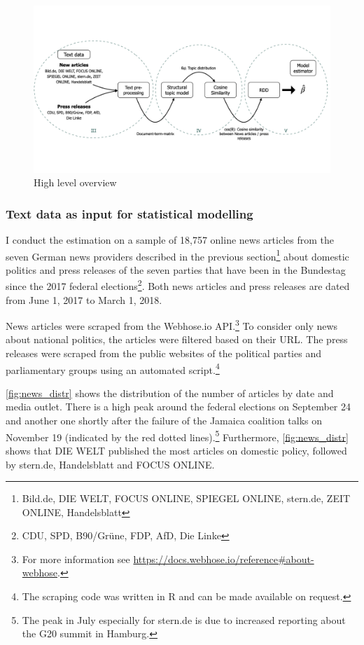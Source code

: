 \documentclass[
  12pt,
]{article}
\begin{document}
\begin{figure}
\centering
\includegraphics{../figs/high_level_overview.png}
\caption{High level overview}
\end{figure}

\hypertarget{text-data-as-input-for-statistical-modelling}{%
\subsubsection{Text data as input for statistical
modelling}\label{text-data-as-input-for-statistical-modelling}}

I conduct the estimation on a sample of 18,757 online news articles from
the seven German news providers described in the previous
section\footnote{Bild.de, DIE WELT, FOCUS ONLINE, SPIEGEL ONLINE,
  stern.de, ZEIT ONLINE, Handelsblatt} about domestic politics and press
releases of the seven parties that have been in the Bundestag since the
2017 federal elections\footnote{CDU, SPD, B90/Grüne, FDP, AfD, Die Linke}.
Both news articles and press releases are dated from June 1, 2017 to
March 1, 2018.

News articles were scraped from the Webhose.io API.\footnote{For more
  information see
  \url{https://docs.webhose.io/reference\#about-webhose}.} To consider
only news about national politics, the articles were filtered based on
their URL. The press releases were scraped from the public websites of
the political parties and parliamentary groups using an automated
script.\footnote{The scraping code was written in R and can be made
  available on request.}

\autoref{fig:news_distr} shows the distribution of the number of
articles by date and media outlet. There is a high peak around the
federal elections on September 24 and another one shortly after the
failure of the Jamaica coalition talks on November 19 (indicated by the
red dotted lines).\footnote{The peak in July especially for stern.de is
  due to increased reporting about the G20 summit in Hamburg.}
Furthermore, \autoref{fig:news_distr} shows that DIE WELT published the
most articles on domestic policy, followed by stern.de, Handelsblatt and
FOCUS ONLINE.
\end{document}
